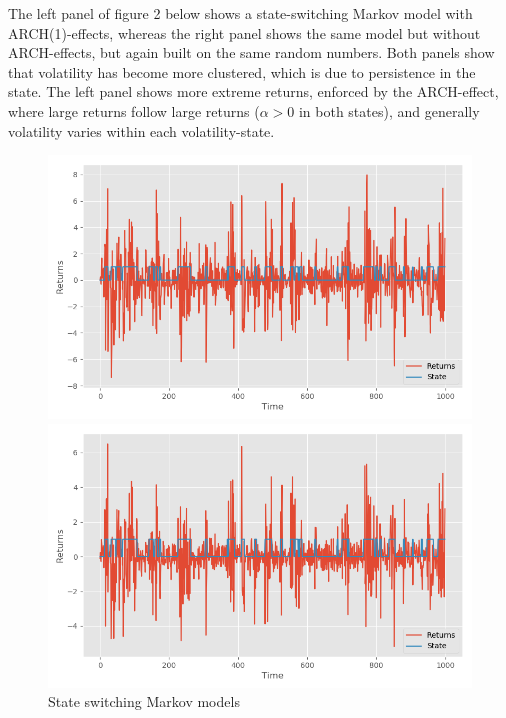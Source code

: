 \documentclass[11pt,a4paper,oneside]{article}
\begin{document}
The left panel of figure 2 below shows a state-switching Markov model with ARCH(1)-effects, whereas the right panel shows the same model but without ARCH-effects, but again built on the same random numbers. Both panels show that volatility has become more clustered, which is due to persistence in the state. The left panel shows more extreme returns, enforced by the ARCH-effect, where large returns follow large returns ($\alpha > 0$ in both states), and generally volatility varies within each volatility-state.
\begin{figure}[ht]
\centering
\captionsetup{justification=centering,margin=0.6cm}
\caption{State switching Markov models}
\begin{minipage}[b]{0.45\linewidth}
\includegraphics[scale = 0.45]{images/931c.png}
\end{minipage}
\hspace{0.5cm}
\begin{minipage}[b]{0.45\linewidth}
\centering
\includegraphics[scale = 0.45]{images/931d.png}
\end{minipage}
\begingroup
{}
\endgroup
\end{figure}
\end{document}
